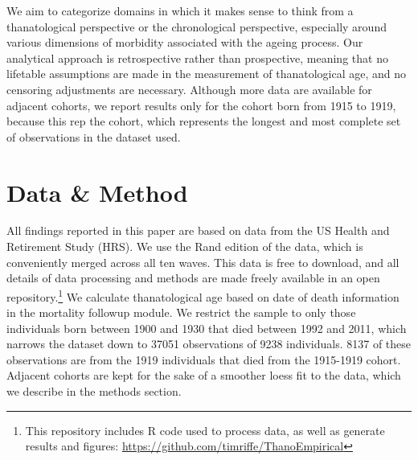 \documentclass{article}
\begin{document}


We aim to categorize domains in which it makes
sense to think from a thanatological perspective or the chronological
perspective, especially around various dimensions of morbidity associated with
the ageing process. Our analytical approach is retrospective rather than
prospective, meaning that no lifetable assumptions are made in the measurement
of thanatological age, and no censoring adjustments are necessary. Although more
data are available for adjacent cohorts, we report results only for the cohort
born from 1915 to 1919, because this rep the cohort, which represents the
longest and most complete set of observations in the dataset used.

\section*{Data \& Method}

All findings reported in this paper are based on data from the US Health and
Retirement Study (HRS). We use the Rand edition of the data, which is
conveniently merged across all ten waves. This data is free to download, and all
details of data processing and methods are made freely available in an open
repository.\footnote{This
repository includes R code used to process data, as well as generate results and
figures: \url{https://github.com/timriffe/ThanoEmpirical}} We
calculate thanatological age based on date of death information in the mortality followup module. We restrict the sample to only those individuals born between 1900 and 1930 that died between 1992 and 2011, which narrows the dataset down to 37051 observations of 9238 individuals. 8137 of these observations are from the 1919 individuals that died from the 1915-1919 cohort. Adjacent cohorts are kept for the sake of a
smoother loess fit to the data, which we describe in the methods section.
\end{document}
